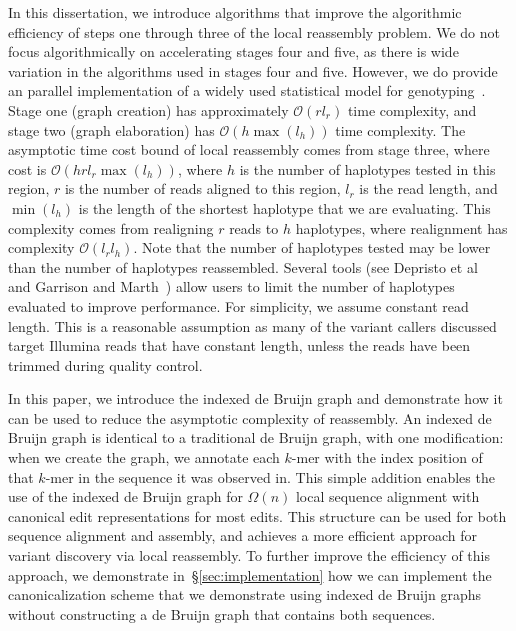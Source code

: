 \documentclass[phd]{ucbthesis}
\begin{document}
In this dissertation, we introduce algorithms that improve the algorithmic efficiency
of steps one through three of the local reassembly problem.
We do not focus algorithmically on accelerating stages four and five, as there is wide
variation in the algorithms used in stages four and five. However, we do provide an parallel
implementation of a widely used statistical model for genotyping~\cite{li11}. Stage one (graph
creation) has approximately $\mathcal{O}(r l_r)$ time complexity, and stage two (graph elaboration) has
$\mathcal{O}(h \max(l_h))$ time complexity.
The asymptotic time cost bound of local reassembly comes from stage three, where cost is $\mathcal{O}(h r l_r
\max(l_h))$, where $h$ is the number of haplotypes tested in this region, $r$ is the number of reads aligned to this region, $l_r$ is the read length,
and $\min(l_h)$ is the length of the
shortest haplotype that we are evaluating. This complexity comes from realigning $r$ reads to $h$
haplotypes, where realignment has complexity $\mathcal{O}(l_r l_h)$. Note that the number of
haplotypes tested may be lower than the number of haplotypes reassembled. Several tools
(see Depristo et al~\cite{depristo11} and Garrison and Marth~\cite{garrison12}) allow users to limit the number of haplotypes evaluated to improve
performance. For simplicity, we assume constant read length. This is a reasonable assumption as many of the variant
callers discussed target Illumina reads that have constant length, unless the reads have been trimmed
during quality control.

In this paper, we introduce the indexed de Bruijn graph and demonstrate how it can be used to
reduce the asymptotic complexity of reassembly. An indexed de Bruijn graph is identical to a
traditional de Bruijn graph, with one modification: when we create the graph, we annotate each
$k$-mer with the index position of that $k$-mer in the sequence it was observed in. This simple addition
enables the use of the indexed de Bruijn graph for $\Omega(n)$ local sequence alignment with
canonical edit representations for most edits. This structure can be used for both sequence alignment and
assembly, and achieves a more efficient approach for variant discovery via local reassembly.
To further improve the efficiency of this approach, we demonstrate in~\S\ref{sec:implementation}
how we can implement the canonicalization scheme that we demonstrate using indexed de Bruijn
graphs without constructing a de Bruijn graph that contains both sequences.
\end{document}
